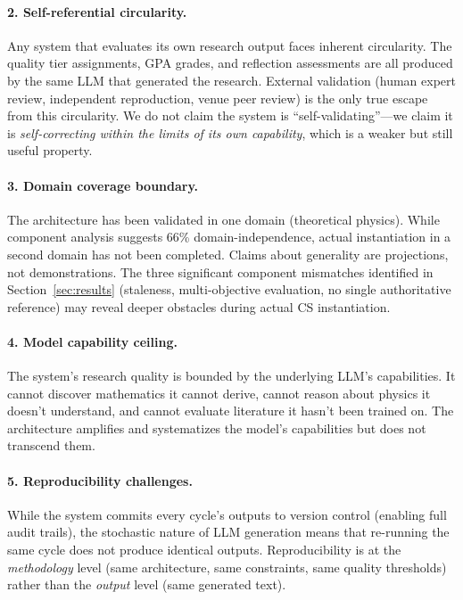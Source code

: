 \documentclass[11pt,a4paper]{article}
\begin{document}
\paragraph{2. Self-referential circularity.}
Any system that evaluates its own research output faces inherent circularity.
The quality tier assignments, GPA grades, and reflection assessments are all
produced by the same LLM that generated the research. External validation
(human expert review, independent reproduction, venue peer review) is the
only true escape from this circularity. We do not claim the system is
``self-validating''---we claim it is \emph{self-correcting within the limits
of its own capability}, which is a weaker but still useful property.

\paragraph{3. Domain coverage boundary.}
The architecture has been validated in one domain (theoretical physics). While
component analysis suggests 66\% domain-independence, actual instantiation in
a second domain has not been completed. Claims about generality are projections,
not demonstrations. The three significant component mismatches identified in
Section~\ref{sec:results} (staleness, multi-objective evaluation, no single
authoritative reference) may reveal deeper obstacles during actual CS instantiation.

\paragraph{4. Model capability ceiling.}
The system's research quality is bounded by the underlying LLM's capabilities.
It cannot discover mathematics it cannot derive, cannot reason about physics
it doesn't understand, and cannot evaluate literature it hasn't been trained on.
The architecture amplifies and systematizes the model's capabilities but does
not transcend them.

\paragraph{5. Reproducibility challenges.}
While the system commits every cycle's outputs to version control (enabling
full audit trails), the stochastic nature of LLM generation means that re-running
the same cycle does not produce identical outputs. Reproducibility is at the
\emph{methodology} level (same architecture, same constraints, same quality
thresholds) rather than the \emph{output} level (same generated text).
\end{document}
